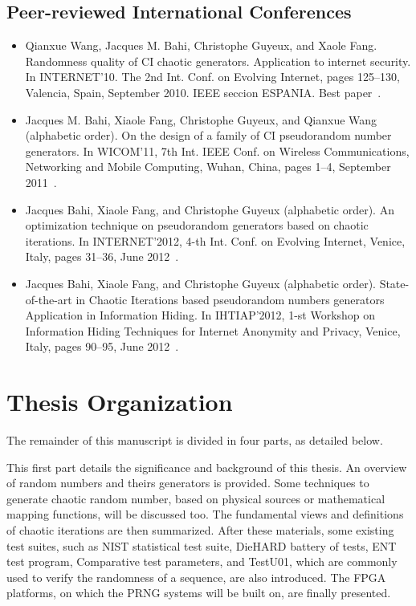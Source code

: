 \subsection{Peer-reviewed International Conferences}
\begin{itemize}

\item Qianxue Wang, Jacques M. Bahi, Christophe Guyeux, and Xaole Fang. Randomness quality of CI chaotic generators. Application to internet security. In INTERNET'10. The 2nd Int. Conf. on Evolving Internet, pages 125--130, Valencia, Spain, September 2010. IEEE seccion ESPANIA. Best paper~\cite{wbg10:ip}.%

\item Jacques M. Bahi, Xiaole Fang, Christophe Guyeux, and Qianxue Wang (alphabetic order). On the design of a family of CI pseudorandom number generators. In WICOM'11, 7th Int. IEEE Conf. on Wireless Communications, Networking and Mobile Computing, Wuhan, China, pages 1--4, September 2011~\cite{bfgw11:ip}.%

\item Jacques Bahi, Xiaole Fang, and Christophe Guyeux (alphabetic order). An optimization technique on pseudorandom generators based on chaotic iterations. In INTERNET'2012, 4-th Int. Conf. on Evolving Internet, Venice, Italy, pages 31--36, June 2012~\cite{bfg12a:ip}.

\item Jacques Bahi, Xiaole Fang, and Christophe Guyeux (alphabetic order). State-of-the-art in Chaotic Iterations based pseudorandom numbers generators Application in Information Hiding. In IHTIAP'2012, 1-st Workshop on Information Hiding Techniques for Internet Anonymity and Privacy, Venice, Italy, pages 90--95, June 2012~\cite{bfg12b:ip}.
\end{itemize}

\section{Thesis Organization}
The remainder of this manuscript is divided in four parts, as detailed below.

This first part details the significance and background of this thesis. An overview of random numbers and theirs generators is provided. Some techniques to generate chaotic random number, based on physical sources or mathematical mapping functions, will be discussed too. The fundamental views and definitions of chaotic iterations are then summarized. After these materials, some existing test suites, such as NIST statistical test suite, 
DieHARD battery of tests, ENT test program, Comparative test parameters, and TestU01, which are commonly used to verify the randomness of a sequence, are also introduced. The FPGA platforms, on which the PRNG systems will be built on, are finally presented.

